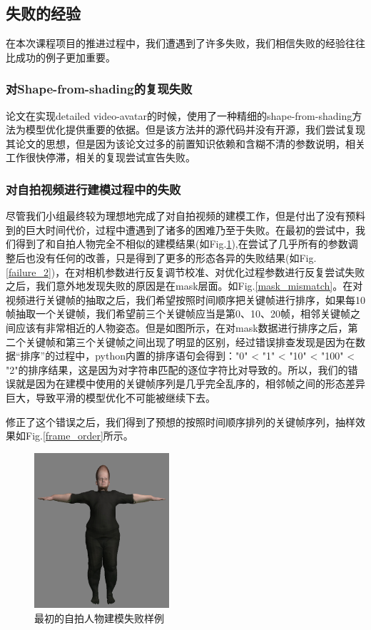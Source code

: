 \documentclass{article}
\begin{document}
\subsection{失败的经验}
在本次课程项目的推进过程中，我们遭遇到了许多失败，我们相信失败的经验往往比成功的例子更加重要。
\subsubsection{对Shape-from-shading的复现失败}
论文\cite{paper2}在实现detailed video-avatar的时候，使用了一种精细的shape-from-shading\cite{shapefromshading}方法为模型优化提供重要的依据。但是该方法并的源代码并没有开源，我们尝试复现其论文的思想，但是因为该论文过多的前置知识依赖和含糊不清的参数说明，相关工作很快停滞，相关的复现尝试宣告失败。
\subsubsection{对自拍视频进行建模过程中的失败}
尽管我们小组最终较为理想地完成了对自拍视频的建模工作，但是付出了没有预料到的巨大时间代价，过程中遭遇到了诸多的困难乃至于失败。在最初的尝试中，我们得到了和自拍人物完全不相似的建模结果(如Fig.\ref{failure_1}),在尝试了几乎所有的参数调整后也没有任何的改善，只是得到了更多的形态各异的失败结果(如Fig.\ref{failure_2})，在对相机参数进行反复调节校准、对优化过程参数进行反复尝试失败之后，我们意外地发现失败的原因是在mask层面。如Fig.\ref{mask_mismatch}。在对视频进行关键帧的抽取之后，我们希望按照时间顺序把关键帧进行排序，如果每10帧抽取一个关键帧，我们希望前三个关键帧应当是第0、10、20帧，相邻关键帧之间应该有非常相近的人物姿态。但是如图所示，在对mask数据进行排序之后，第二个关键帧和第三个关键帧之间出现了明显的区别，经过错误排查发现是因为在数据“排序”的过程中，python内置的排序语句会得到："0" < "1" < "10" < "100" < "2"的排序结果，这是因为对字符串匹配的逐位字符比对导致的。所以，我们的错误就是因为在建模中使用的关键帧序列是几乎完全乱序的，相邻帧之间的形态差异巨大，导致平滑的模型优化不可能被继续下去。

修正了这个错误之后，我们得到了预想的按照时间顺序排列的关键帧序列，抽样效果如Fig.\ref{frame_order}所示。

\begin{figure}
	\centering
	\includegraphics[width=5cm]{figure/failure_1.png}
	\caption{最初的自拍人物建模失败样例}
	\label{failure_1}
\end{figure}
\end{document}
